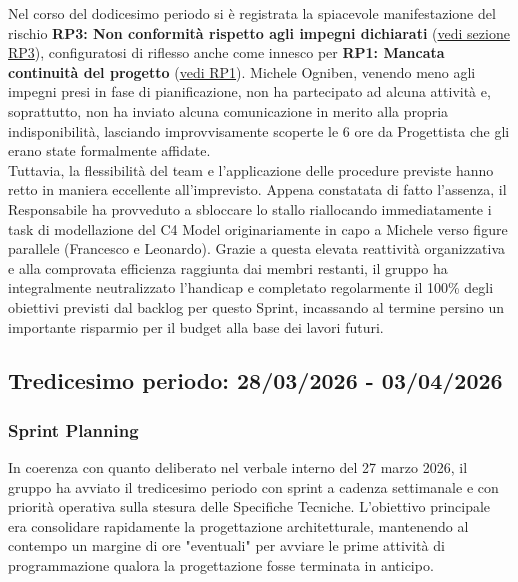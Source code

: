 \documentclass[a4paper, 11pt, oneside]{scrartcl} %
\begin{document}
Nel corso del dodicesimo periodo si è registrata la spiacevole manifestazione del rischio \textbf{RP3: Non conformità rispetto agli impegni dichiarati} (\hyperref[sec:rp3]{vedi sezione RP3}), configuratosi di riflesso anche come innesco per \textbf{RP1: Mancata continuità del progetto} (\hyperref[sec:rp1]{vedi RP1}).
Michele Ogniben, venendo meno agli impegni presi in fase di pianificazione, non ha partecipato ad alcuna attività e, soprattutto, non ha inviato alcuna comunicazione in merito alla propria indisponibilità, lasciando improvvisamente scoperte le 6 ore da Progettista che gli erano state formalmente affidate.\\
Tuttavia, la flessibilità del team e l'applicazione delle procedure previste hanno retto in maniera eccellente all'imprevisto. Appena constatata di fatto l'assenza, il Responsabile ha provveduto a sbloccare lo stallo riallocando immediatamente i task di modellazione del C4 Model originariamente in capo a Michele verso figure parallele (Francesco e Leonardo). Grazie a questa elevata reattività organizzativa e alla comprovata efficienza raggiunta dai membri restanti, il gruppo ha integralmente neutralizzato l'handicap e completato regolarmente il 100\% degli obiettivi previsti dal backlog per questo Sprint, incassando al termine persino un importante risparmio per il budget alla base dei lavori futuri.

\newpage

\subsection{Tredicesimo periodo: 28/03/2026 - 03/04/2026}

\subsubsection*{Sprint Planning}

In coerenza con quanto deliberato nel verbale interno del 27 marzo 2026, il gruppo ha avviato il tredicesimo periodo con sprint a cadenza settimanale e con priorità operativa sulla stesura delle Specifiche Tecniche. L'obiettivo principale era consolidare rapidamente la progettazione architetturale, mantenendo al contempo un margine di ore "eventuali" per avviare le prime attività di programmazione qualora la progettazione fosse terminata in anticipo.
\end{document}
